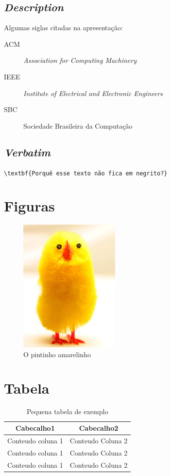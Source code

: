 \documentclass{article}
\begin{document}
		\subsection{\textit{Description}}
			Algumas siglas citadas na apresentação:
			\begin{description}
				\item[ACM] \textit{Association for Computing Machinery}
				\item[IEEE]	\textit{Institute of Electrical and Electronic Engineers}
				\item[SBC] Sociedade Brasileira da Computação
			\end{description}

		\subsection{\textit{Verbatim}}
			\label{verbatim}\verb|\textbf{Porquê esse texto não fica em negrito?}|
	
	\section{Figuras}
		\begin{figure}[h]
			\centering
			\label{pinto}
			\includegraphics{chick.png}
			\caption{O pintinho amarelinho}
		\end{figure}
	
	\section{Tabela}
		\begin{table}[h]
			\centering
			\begin{tabular}{c|c}
				\hline	Cabecalho1			&	Cabecalho2	\\
				\hline	Conteudo coluna 1	&	Conteudo Coluna 2	\\
				\hline	Conteudo coluna 1	&	Conteudo Coluna 2	\\
				\hline	Conteudo coluna 1	&	Conteudo Coluna 2	\\
				\hline
			\end{tabular}
			\caption{Pequena tabela de exemplo}
		\end{table}
	
\end{document}

